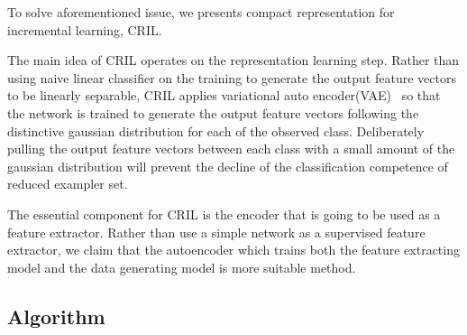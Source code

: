 To solve aforementioned issue, we presents compact representation for incremental learning, CRIL.

The main idea of CRIL operates on the representation learning step. Rather than using naive linear classifier on the training to generate the output feature vectors to be linearly separable, CRIL applies variational auto encoder(VAE)~\cite{Kingma:2013aa} so that the network is trained to generate the output feature vectors following the distinctive gaussian distribution for each of the observed class. Deliberately pulling the output feature vectors between each class with a small amount of the gaussian distribution will prevent the decline of the classification competence of reduced exampler set.

The essential component for CRIL is the encoder that is going to be used as a feature extractor. Rather than use a simple network as a supervised feature extractor, we claim that the autoencoder which trains both the feature extracting model and the data generating model is more suitable method.

\subsection{Algorithm} %
\label{sec:algorithm}
